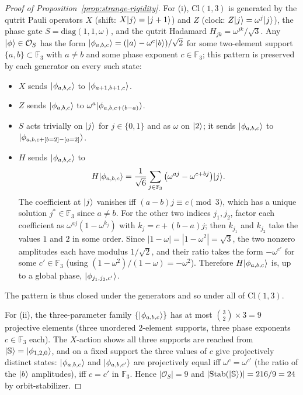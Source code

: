 \documentclass[11pt]{article}
\theoremstyle{definition}
\newcommand{\microspace}{\mspace{0.5mu}}
\newcommand{\ket}[1]{\lvert\microspace #1 \microspace \rangle}
\newcommand{\F}{\mathcal{F}}
\renewcommand{\F}[1]{\mathbb{F}_{#1}}
\newcommand{\Strange}{\ket{\mathbb{S}}}
\newcommand{\Cl}{\mathrm{Cl}}
\begin{document}
	\begin{proof}[Proof of Proposition~\ref{prop:strange-rigidity}]
		For (i), $\Cl(1, 3)$ is generated by the qutrit Pauli operators
		$X$ (shift: $X \ket{j} = \ket{j + 1}$) and $Z$ (clock:
		$Z \ket{j} = \omega^j \ket{j}$), the phase gate
		$S = \mathrm{diag}(1, 1, \omega)$, and the qutrit Hadamard
		$H_{jk} = \omega^{jk}/\sqrt 3$. Any
		$\ket\phi \in \mathcal{O}_S$ has the form
		$\ket{\phi_{a,b,c}} = (\ket a - \omega^c \ket b)/\sqrt 2$ for some
		two-element support $\{a, b\} \subset \F{3}$ with $a \ne b$ and
		some phase exponent $c \in \F{3}$; this pattern is preserved by
		each generator on every such state:
		\begin{itemize}
			\item $X$ sends $\ket{\phi_{a, b, c}}$ to
			$\ket{\phi_{a+1, b+1, c}}$.
			\item $Z$ sends $\ket{\phi_{a, b, c}}$ to
			$\omega^a \ket{\phi_{a, b, c + (b - a)}}$.
			\item $S$ acts trivially on $\ket{j}$ for $j \in \{0, 1\}$ and as
			$\omega$ on $\ket{2}$; it sends $\ket{\phi_{a, b, c}}$ to
			$\ket{\phi_{a, b, c + [b = 2] - [a = 2]}}$.
			\item $H$ sends $\ket{\phi_{a, b, c}}$ to
			\begin{equation*}
				H \ket{\phi_{a,b,c}} = \frac{1}{\sqrt 6} \sum_{j \in \F{3}}
				\big(\omega^{a j} - \omega^{c + b j}\big) \ket{j}.
			\end{equation*}
			The coefficient at $\ket{j}$ vanishes iff
			$(a - b) j \equiv c \pmod 3$, which has a unique solution
			$j^\ast \in \F{3}$ since $a \ne b$. For the other two indices
			$j_1, j_2$, factor each coefficient as
			$\omega^{a j}(1 - \omega^{k_j})$ with $k_j = c + (b - a) j$;
			then $k_{j_1}$ and $k_{j_2}$ take the values $1$ and $2$ in
			some order. Since $|1 - \omega| = |1 - \omega^2| = \sqrt 3$,
			the two nonzero amplitudes each have modulus $1/\sqrt 2$, and
			their ratio takes the form $-\omega^{c'}$ for some
			$c' \in \F{3}$ (using $(1 - \omega^2)/(1 - \omega) = -\omega^2$).
			Therefore $H \ket{\phi_{a, b, c}}$ is, up to a global phase,
			$\ket{\phi_{j_1, j_2, c'}}$.
		\end{itemize}
		The pattern is thus closed under the generators and so under all
		of $\Cl(1, 3)$.
		
		For (ii), the three-parameter family $\{\ket{\phi_{a, b, c}}\}$
		has at most $\binom{3}{2} \times 3 = 9$ projective elements (three
		unordered $2$-element supports, three phase exponents
		$c \in \F{3}$ each). The $X$-action shows all three supports are
		reached from $\Strange = \ket{\phi_{1, 2, 0}}$, and on a fixed
		support the three values of $c$ give projectively distinct
		states: $\ket{\phi_{a, b, c}}$ and $\ket{\phi_{a, b, c'}}$ are
		projectively equal iff $\omega^c = \omega^{c'}$ (the ratio of
		the $\ket b$ amplitudes), iff $c = c'$ in $\F{3}$. Hence
		$|\mathcal{O}_S| = 9$ and
		$|\mathrm{Stab}(\Strange)| = 216/9 = 24$ by orbit-stabilizer.


\end{proof}
\end{document}
